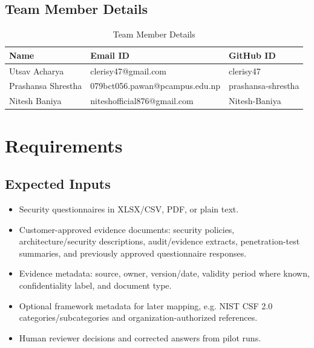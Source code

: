 \documentclass[11pt,journal,onecolumn]{IEEEtran}
\begin{document}
\subsection{Team Member Details}
\begin{table}[H]
\centering
\caption{Team Member Details}
\begin{tabularx}{\textwidth}{L{0.27\textwidth}YY}
\toprule
\textbf{Name} & \textbf{Email ID} & \textbf{GitHub ID} \\
\midrule
Utsav Acharya & clerisy47@gmail.com & clerisy47 \\
Prashansa Shrestha & 079bct056.pawan@pcampus.edu.np & prashansa-shrestha \\
Nitesh Baniya & niteshofficial876@gmail.com & Nitesh-Baniya \\
\bottomrule
\end{tabularx}
\end{table}

\section{Requirements}

\subsection{Expected Inputs}
\begin{itemize}[leftmargin=1.7em]
    \item Security questionnaires in XLSX/CSV, PDF, or plain text.
    \item Customer-approved evidence documents: security policies, architecture/security descriptions, audit/evidence extracts, penetration-test summaries, and previously approved questionnaire responses.
    \item Evidence metadata: source, owner, version/date, validity period where known, confidentiality label, and document type.
    \item Optional framework metadata for later mapping, e.g. NIST CSF 2.0 categories/subcategories and organization-authorized references.
    \item Human reviewer decisions and corrected answers from pilot runs.
\end{itemize}
\end{document}
